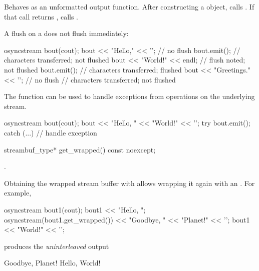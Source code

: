 \begin{itemdescr}
\pnum
\effects
Behaves as an unformatted output function.
After constructing a  object, calls .
If that call returns ,
calls .

\pnum
\begin{example}
A flush on a  does not flush immediately:
\begin{codeblock}
{
  osyncstream bout(cout);
  bout << "Hello," << '\n';     // no flush
  bout.emit();                  // characters transferred;  not flushed
  bout << "World!" << endl;     // flush noted;  not flushed
  bout.emit();                  // characters transferred;  flushed
  bout << "Greetings." << '\n'; // no flush
}   // characters transferred;  not flushed
\end{codeblock}
\end{example}

\pnum
\begin{example}
The function  can be used to
handle exceptions from operations on the underlying stream.
\begin{codeblock}
{
  osyncstream bout(cout);
  bout << "Hello, " << "World!" << '\n';
  try {
    bout.emit();
  } catch (...) {
    // handle exception
  }
}
\end{codeblock}
\end{example}
\end{itemdescr}

%
\begin{itemdecl}
streambuf_type* get_wrapped() const noexcept;
\end{itemdecl}

\begin{itemdescr}
\pnum
\returns
{}.

\pnum
\begin{example}
Obtaining the wrapped stream buffer with 
allows wrapping it again with an .
For example,
\begin{codeblock}
{
  osyncstream bout1(cout);
  bout1 << "Hello, ";
  {
    osyncstream(bout1.get_wrapped()) << "Goodbye, " << "Planet!" << '\n';
  }
  bout1 << "World!" << '\n';
}
\end{codeblock}
produces the \textit{uninterleaved} output
\begin{outputblock}
Goodbye, Planet!
Hello, World!
\end{outputblock}
\end{example}
\end{itemdescr}

